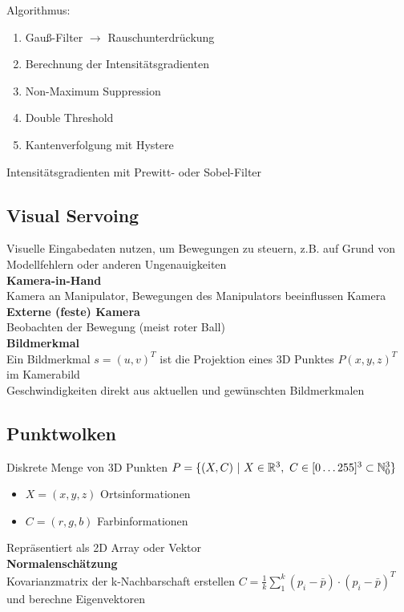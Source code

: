 Algorithmus:
\begin{enumerate}
\item Gauß-Filter \(\rightarrow\) Rauschunterdrückung
\item Berechnung der Intensitätsgradienten
\item Non-Maximum Suppression
\item Double Threshold
\item Kantenverfolgung mit Hystere
\end{enumerate}

Intensitätsgradienten mit Prewitt- oder Sobel-Filter

\subsection{Visual Servoing}%
\label{bv:sub:visual-servoing}
Visuelle Eingabedaten nutzen, um Bewegungen zu steuern, z.B. auf Grund von Modellfehlern oder anderen Ungenauigkeiten\\

\textbf{Kamera-in-Hand}\\
Kamera an Manipulator, Bewegungen des Manipulators beeinflussen Kamera\\

\textbf{Externe (feste) Kamera}\\
Beobachten der Bewegung (meist roter Ball)\\

\textbf{Bildmerkmal}\\
Ein Bildmerkmal \(s = (u,v)^T\) ist die Projektion eines 3D Punktes \(P (x, y, z)^T\) im Kamerabild\\
Geschwindigkeiten direkt aus aktuellen und gewünschten Bildmerkmalen\\

\subsection{Punktwolken}%
\label{bv:sub:punktwolken}
Diskrete Menge von 3D Punkten \(P = \{(X, C)\ |\ X \in \mathbb{R}^3,\ C \in [0 \ldots 255]^3 \subset \mathbb{N}^3_0\}\)
\begin{itemize}
\item \(X = (x, y, z)\) Ortsinformationen
\item \(C = (r, g, b)\) Farbinformationen
\end{itemize}
Repräsentiert als 2D Array oder Vektor\\

\textbf{Normalenschätzung}\\
Kovarianzmatrix der k-Nachbarschaft erstellen \(C = \frac{1}{k} \sum_1^k (p_i - \bar{p}) \cdot (p_i - \bar{p})^T\)
und berechne Eigenvektoren\\

